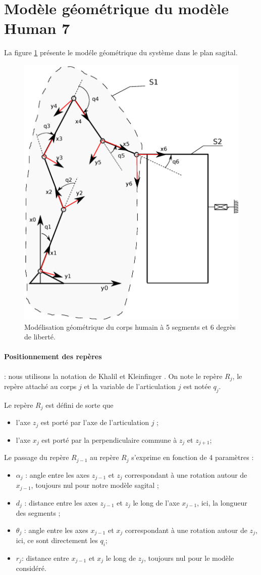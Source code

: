 \documentclass[a4paper, 10pt ]{article}
\begin{document}
\newpage
\appendix
\section{Modèle géométrique du modèle Human 7 }
\label{Annexe1}

La figure \ref{fig:ModelHuman7GMannexe} présente le modéle géométrique du système dans le plan sagital.

\begin{figure}[h]
\centering
\includegraphics[width=0.5\columnwidth]{images/model/modeleHommeQ7MG.eps}
\caption{Modélisation géométrique du corps humain à 5 segments et 6 degrès de liberté.}
\label{fig:ModelHuman7GMannexe}
\end{figure}

\paragraph{Positionnement des repères} : nous utilisons la notation  de Khalil et Kleinfinger \cite{Khalil86a}. On note le repère $R_j$, le repère attaché au corps $j$ et la variable de l'articulation $j$ est notée $q_j$.

Le repère $R_j$ est défini de sorte que 
\begin{itemize}
\item l'axe $z_j$ est porté par l'axe de l'articulation $j$ ; 
\item l'axe $x_j$ est porté par la perpendiculaire commune à $z_j$ et $z_{j+1}$;
\end{itemize}

Le passage du repère $R_{j-1}$ au repère $R_j$ s'exprime en fonction de 4 paramètres : 
\begin{itemize}
\item $\alpha_j$ : angle entre les axes $z_{j-1}$ et $z_{j}$ correspondant à une rotation autour de $x_{j-1}$, toujours nul pour notre modèle sagital ;
\item $d_j$ : distance entre les axes $z_{j-1}$ et $z_{j}$ le long de l'axe $x_{j-1}$, ici, la longueur des segments \cite{Winter90};
\item $\theta_j$ : angle entre les axes $x_{j-1}$ et $x_{j}$ correspondant à une rotation autour de $z_j$, ici, ce sont directement les $q_i$;
\item $r_j$: distance entre $x_{j-1}$ et $x_{j}$ le long de $z_j$, toujours nul pour le modèle considéré.
\end{itemize}
\end{document}
